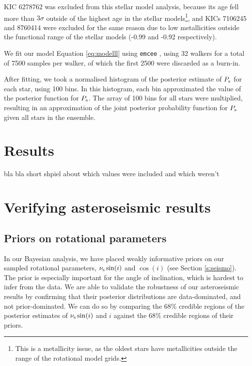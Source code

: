 KIC 6278762 was excluded from this stellar model analysis, because its age fell more than $3\sigma$ outside of the highest age in the stellar models\footnote{This is a metallicity issue, as the oldest stars have metallicities outside the range of the rotational model grids.}, and KICs 7106245 and 8760414 were excluded for the same reason due to low metallicities outside the functional range of the stellar models (-0.99 and -0.92 respectively).

We fit our model Equation \ref{eq:modelll} using \texttt{emcee} \cite{foreman-mackey+2013}, using 32 walkers for a total of 7500 samples per walker, of which the first 2500 were discarded as a burn-in.

After fitting, we took a normalised histogram of the posterior estimate of $P_{\rm s}$ for each star, using 100 bins. In this histogram, each bin approximated the value of the posterior function for $P_{\rm s}$. The array of 100 bins for all stars were multiplied, resulting in an approximation of the joint posterior probability function for $P_{\rm s}$ given all stars in the ensemble.



\section{Results}
bla bla short shpiel about which values were included and which weren't

\section{Verifying asteroseismic results}
\subsection{Priors on rotational parameters}
In our Bayesian analysis, we have placed weakly informative priors on our sampled rotational parameters, $\nu_{\rm s}\sin(i)$ and $\cos(i)$ (see Section \ref{s:seismo}). The prior is especially important for the angle of inclination, which is hardest to infer from the data. We are able to validate the robustness of our asteroseismic results by confirming that their posterior distributions are data-dominated, and not prior-dominated. We can do so by comparing the $68\%$ credible regions of the posterior estimates of $\nu_{\rm s}\sin(i)$ and $i$ against the $68\%$ credible regions of their priors.

